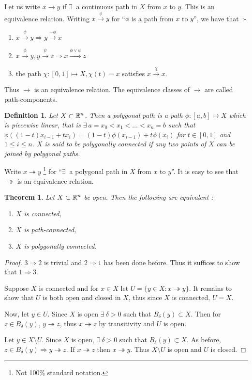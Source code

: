 \documentclass{notes}
\theoremstyle{plain}
\newtheorem{theorem}[proposition]{Theorem}
\newtheorem{definition}[proposition]{Definition}
\begin{document}
Let us write $x \rightarrow y$ if $\exists\ $ a continuous path in $X$
from $x$ to $y$.  This is an equivalence relation.  Writing
$x \xrightarrow{\phi} y$ for ``$\phi$ is a path from $x$ to $y$'', we have
that~:-

\begin{enumerate}
\item $x \xrightarrow{\phi} y \Rightarrow y \xrightarrow{-\phi} x$
\item $x \xrightarrow{\phi} y,
y \xrightarrow{\psi} z \Rightarrow x \xrightarrow{\phi \vee \psi} z$
\item the path $\chi \colon [0,1] \mapsto X, \chi(t) = x$ satisfies
$x \xrightarrow{\chi} x$.
\end{enumerate}

Thus $\rightarrow$ is an equivalence relation.  The equivalence
classes of $\rightarrow$ are called path-components.

\begin{definition}
Let $X \subset \mathbb{R}^n$.  Then a polygonal path is a path
$\phi \colon [a,b] \mapsto X$ which is piecewise linear, that is
$\exists\ a=x_0 < x_1 < \dots < x_n = b$ such that
$\phi((1-t)x_{i-1} + t x_i) = (1-t) \phi(x_{i-1}) + t \phi(x_i)$ for
$t \in [0,1]$ and $1 \le i \le n$.  $X$ is said to be polygonally connected
if any two points of $X$ can be joined by polygonal paths.
\end{definition}

Write $x \twoheadrightarrow y$ \footnote{Not 100\% standard notation.}
 for ``$\exists\ $ a polygonal path in $X$ from
$x$ to $y$''.  It is easy to see that $\twoheadrightarrow$ is an equivalence
relation.

\begin{theorem}
Let $X \subset \mathbb{R}^n$ be open.  Then the following are equivalent :-
\begin{enumerate}
\item $X$ is connected,
\item $X$ is path-connected,
\item $X$ is polygonally connected.
\end{enumerate}
\end{theorem}

\begin{proof}
$3 \Rightarrow 2$ is trivial and $2 \Rightarrow 1$ has been done before.  Thus
it suffices to show that $1 \Rightarrow 3$.

Suppose $X$ is connected and for $x \in X$ let $U = \{ y \in X : 
x \twoheadrightarrow y \}$.  It remains to show that $U$ is both open and
closed in $X$, thus since $X$ is connected, $U = X$.

Now, let $y \in U$.  Since $X$ is open $\exists\ \delta>0$ such that
$B_\delta(y) \subset X$.  Then for $z \in B_\delta(y)$, $y \twoheadrightarrow
z$, thus $x \twoheadrightarrow z$ by transitivity and $U$ is open.

Let $y \in X \setminus U$.  Since $X$ is open, $\exists\ \delta > 0$ such
that $B_\delta(y) \subset X$.  As before, $z \in B_\delta(y) \Rightarrow
y \twoheadrightarrow z$.  If $x \twoheadrightarrow z$ then
$x \twoheadrightarrow y$.  Thus $X \setminus U$ is open and $U$ is closed.
\end{proof}
\end{document}
